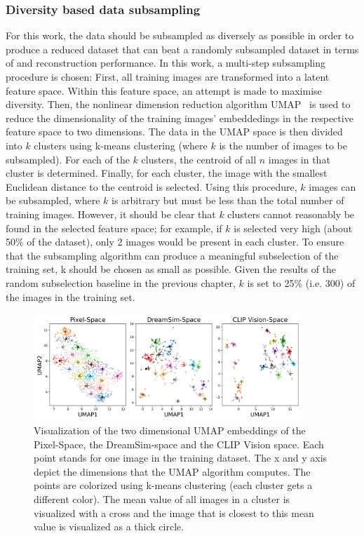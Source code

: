 \subsubsection{Diversity based data subsampling}

For this work, the data should be subsampled as diversely as possible in order to produce a reduced dataset that can beat a randomly subsampled dataset in terms of  and reconstruction performance. In this work, a multi-step subsampling procedure is chosen: First, all training images are transformed into a latent feature space. Within this feature space, an attempt is made to maximise diversity. Then, the nonlinear dimension reduction algorithm UMAP~\cite{mcinnesUMAPUniformManifold2018} is used to reduce the dimensionality of the training images' embeddedings in the respective feature space to two dimensions. The data in the UMAP space is then divided into $k$ clusters using k-means clustering (where $k$ is the number of images to be subsampled). For each of the $k$ clusters, the centroid of all $n$ images in that cluster is determined. Finally, for each cluster, the image with the smallest Euclidean distance to the centroid is selected. Using this procedure, $k$ images can be subsampled, where $k$ is arbitrary but must be less than the total number of training images. However, it should be clear that $k$ clusters cannot reasonably be found in the selected feature space; for example, if $k$ is selected very high (about 50\% of the dataset), only 2 images would be present in each cluster. To ensure that the subsampling algorithm can produce a meaningful subselection of the training set, k should be chosen as small as possible. Given the results of the random subselection baseline in the previous chapter, $k$ is set to 25\% (i.e. 300) of the images in the training set. 

\begin{figure}[ht]
    \centering
    \includegraphics[width=0.9\textwidth]{plots/dropout_umap.png}
    \caption[UMAP visualization of diversity based subsampling]{Visualization of the two dimensional UMAP embeddings of the Pixel-Space, the DreamSim-space and the CLIP Vision space. Each point stands for one image in the training dataset. The x and y axis depict the dimensions that the UMAP algorithm computes. The points are colorized using k-means clustering (each cluster gets a different color). The mean value of all images in a cluster is visualized with a cross and the image that is closest to this mean value is visualized as a thick circle.}\label{fig:dropout_umap}
\end{figure}



